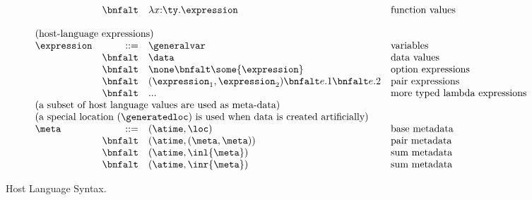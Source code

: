 \begin{figure*}[t]
\[\begin{array}{lrll}
& \bnfalt & \lambda x{:}\ty.\expression & \mbox{function values} \\
\\
\multicolumn{4}{l}{\mbox{(host-language expressions)}}\\ 
\expression & ::= & \generalvar & \mbox{variables} \\
 & \bnfalt & \data & \mbox{data values} \\
 & \bnfalt & \none \bnfalt 
              \some{\expression} & \mbox{option expressions}\\
 & \bnfalt & (\expression_1,\expression_2) \bnfalt e.1 \bnfalt e.2 
    & \mbox{pair expressions} \\
 & \bnfalt & ... & \mbox{more typed lambda expressions} \\
\multicolumn{4}{l}{\mbox{(a subset of host language values are used as meta-data)}}\\ 
\multicolumn{4}{l}{\mbox{(a special location (\generatedloc) is used when data is created artificially)}}\\ 
\meta & ::=     
& (\atime,\loc) & \mbox{base metadata} \\
& \bnfalt & (\atime,(\meta,\meta)) & \mbox{pair metadata} \\
& \bnfalt & (\atime,\inl{\meta}) & \mbox{sum metadata} \\
& \bnfalt & (\atime,\inr{\meta}) & \mbox{sum metadata} \\
\end{array}
\]
\caption{Host Language Syntax.}
\label{fig:host-language}
\end{figure*}

